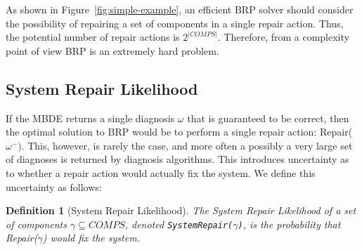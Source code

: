 \documentclass[review]{elsarticle}
\newtheorem{definition}{Definition}
\newcommand\sysrep[1]{{\tt SystemRepair(#1)}}
\newcommand{\COMPS}{\textit{COMPS}}
\begin{document}

As shown in Figure~\ref{fig:simple-example}, an efficient BRP solver should consider the possibility of repairing a set of components in a single repair action. Thus, the potential number of repair actions is %
$2^{|\COMPS|}$. Therefore, from a complexity point of view BRP is an extremely hard problem.





\subsection{System Repair Likelihood}
If the MBDE returns a single diagnosis $\omega$ that is guaranteed to be correct, then the optimal solution to BRP would be to perform a single repair action: Repair($\omega^{-})$. %
This, however, is rarely the case, and more often a possibly a very large set of diagnoses is returned by diagnosis algorithms. This introduces uncertainty as to whether a repair action would actually fix the system. We define this uncertainty as follows:

\begin{definition}[System Repair Likelihood]
The System Repair Likelihood of a set of components $\gamma\subseteq \COMPS$, denoted \sysrep{$\gamma$}, is the probability that Repair($\gamma$) would fix the system.
\end{definition}
\end{document}
